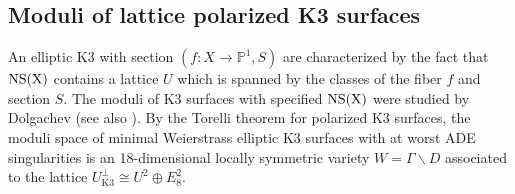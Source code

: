 \documentclass[11pt]{amsart}
\theoremstyle{definition}
\newtheorem{definition}[theorem]{Definition}
\theoremstyle{remark}
\newcommand{\C}{{\mathbb C}}
\newcommand{\Z}{{\mathbb Z}}
\newcommand{\bP}{{\mathbb P}}
\begin{document}
	
	
	
	
	
	
	
	
	
	\subsection{Moduli of lattice polarized K3 surfaces}
	An elliptic K3 with section $(f: X \to \bP^1, S)$ are characterized by the fact that $\rm{NS}(X)$ contains a lattice $U$ which is spanned by the classes of the fiber $f$ and section $S$. The moduli of K3 surfaces with specified $\rm{NS}(X)$ were studied by Dolgachev \cite{dolgachev} (see also \cite{nikulin}). By the Torelli theorem for polarized K3 surfaces, the moduli space of minimal Weierstrass elliptic K3 surfaces with at worst ADE singularities is an 18-dimensional locally symmetric variety $W = \Gamma\backslash D$ associated to the lattice $U^\perp_{\textrm{K}3} \cong U^2 \oplus E^2_8$.
	
\end{document}
